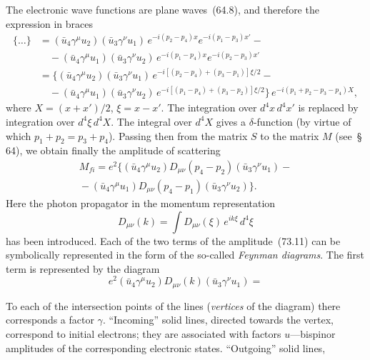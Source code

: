 The electronic wave functions are plane waves~(64.8), and therefore the expression in braces
\begin{align*}
\{\ldots\} &= (\bar{u}_4\gamma^\mu u_2)(\bar{u}_3\gamma^\nu u_1)\,e^{-i(p_2-p_4)x}e^{-i(p_1-p_3)x'} -{}\\
&\quad{} - (\bar{u}_4\gamma^\mu u_1)(\bar{u}_3\gamma^\nu u_2)\,e^{-i(p_1-p_4)x}e^{-i(p_2-p_3)x'}\\
&= \{(\bar{u}_4\gamma^\mu u_2)(\bar{u}_3\gamma^\nu u_1)\,e^{-i[(p_2-p_4)+(p_3-p_1)]\xi/2} -{}\\
&\quad{} - (\bar{u}_4\gamma^\mu u_1)(\bar{u}_3\gamma^\nu u_2)\,e^{-i[(p_1-p_4)+(p_3-p_2)]\xi/2}\}\,e^{-i(p_1+p_2-p_3-p_4)X},
\end{align*}
where $X = (x+x')/2$, $\xi = x - x'$. The integration over $d^4x\,d^4x'$ is replaced by integration over $d^4\xi\,d^4X$. The integral over $d^4X$ gives a $\delta$-function (by virtue of which $p_1 + p_2 = p_3 + p_4$). Passing then from the matrix $S$ to the matrix $M$ (see~\S\,64), we obtain finally the amplitude of scattering
\begin{equation}
\begin{split}
M_{fi} = e^2\{(\bar{u}_4\gamma^\mu u_2)D_{\mu\nu}(p_4-p_2)(\bar{u}_3\gamma^\nu u_1) -{}\\
{} - (\bar{u}_4\gamma^\mu u_1)D_{\mu\nu}(p_4-p_1)(\bar{u}_3\gamma^\nu u_2)\}.
\end{split}
\tag{73.11}
\end{equation}
Here the photon propagator in the momentum representation
\begin{equation}
D_{\mu\nu}(k) = \int D_{\mu\nu}(\xi)\,e^{ik\xi}\,d^4\xi
\tag{73.12}
\end{equation}
has been introduced. Each of the two terms of the amplitude~(73.11) can be symbolically represented in the form of the so-called \textit{Feynman diagrams}. The first term is represented by the diagram
\begin{equation}
e^2(\bar{u}_4\gamma^\mu u_2)D_{\mu\nu}(k)(\bar{u}_3\gamma^\nu u_1) =
\tag{73.13}
\end{equation}

To each of the intersection points of the lines (\textit{vertices} of the diagram) there corresponds a factor $\gamma$. ``Incoming'' solid lines, directed towards the vertex, correspond to initial electrons; they are associated with factors $u$---bispinor amplitudes of the corresponding electronic states. ``Outgoing'' solid lines,

